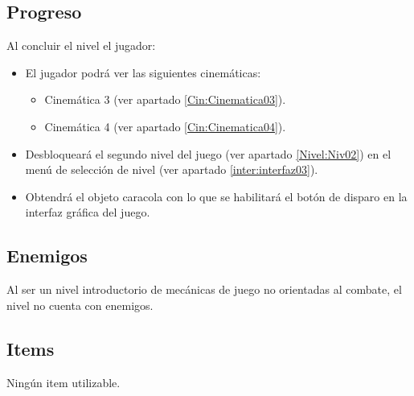 	\subsection{Progreso}
	Al concluir el nivel el jugador:
\begin{itemize}
	\item El jugador podrá ver las siguientes cinemáticas:
	\begin{itemize}
		\item Cinemática 3 (ver apartado \ref{Cin:Cinematica03}).
		\item Cinemática 4 (ver apartado \ref{Cin:Cinematica04}).
	\end{itemize}
\item Desbloqueará el segundo nivel del juego (ver apartado \ref{Nivel:Niv02}) en el menú de selección de nivel (ver apartado \ref{inter:interfaz03}).
\item Obtendrá el objeto caracola con lo que se habilitará el botón de disparo en la interfaz gráfica del juego.
\end{itemize}
	\subsection{Enemigos}
Al ser un nivel introductorio de mecánicas de juego no orientadas al combate, el nivel no cuenta con enemigos.
	\subsection{Items}
Ningún item utilizable.
